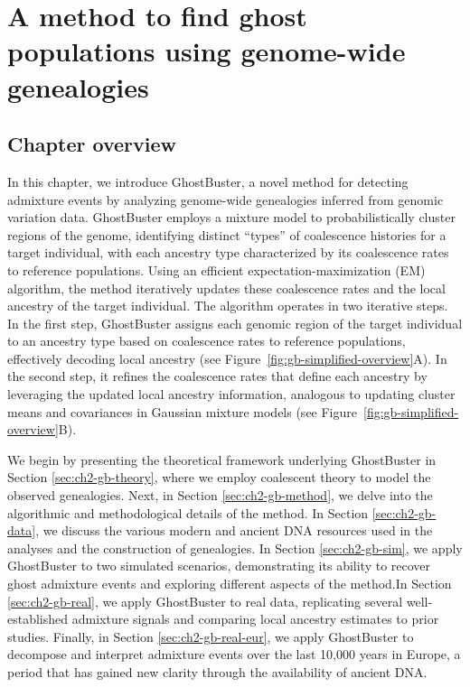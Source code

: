 \chapter{\label{ch:2-gb-method}A method to find ghost populations using genome-wide genealogies}

\minitoc

\section{Chapter overview}
In this chapter, we introduce GhostBuster, a novel method for detecting admixture events by analyzing genome-wide genealogies inferred from genomic variation data. GhostBuster employs a mixture model to probabilistically cluster regions of the genome, identifying distinct ``types'' of coalescence histories for a target individual, with each ancestry type characterized by its coalescence rates to reference populations. Using an efficient expectation-maximization (EM) algorithm, the method iteratively updates these coalescence rates and the local ancestry of the target individual. The algorithm operates in two iterative steps. In the first step, GhostBuster assigns each genomic region of the target individual to an ancestry type based on coalescence rates to reference populations, effectively decoding local ancestry (see Figure~\ref{fig:gb-simplified-overview}A). In the second step, it refines the coalescence rates that define each ancestry by leveraging the updated local ancestry information, analogous to updating cluster means and covariances in Gaussian mixture models (see Figure~\ref{fig:gb-simplified-overview}B).

We begin by presenting the theoretical framework underlying GhostBuster in Section \ref{sec:ch2-gb-theory}, where we employ coalescent theory to model the observed genealogies. Next, in Section \ref{sec:ch2-gb-method}, we delve into the algorithmic and methodological details of the method. In Section \ref{sec:ch2-gb-data}, we discuss the various modern and ancient DNA resources used in the analyses and the construction of genealogies. In Section \ref{sec:ch2-gb-sim}, we apply GhostBuster to two simulated scenarios, demonstrating its ability to recover ghost admixture events and exploring different aspects of the method.In Section \ref{sec:ch2-gb-real}, we apply GhostBuster to real data, replicating several well-established admixture signals and comparing local ancestry estimates to prior studies. Finally, in Section \ref{sec:ch2-gb-real-eur}, we apply GhostBuster to decompose and interpret admixture events over the last 10,000 years in Europe, a period that has gained new clarity through the availability of ancient DNA.

